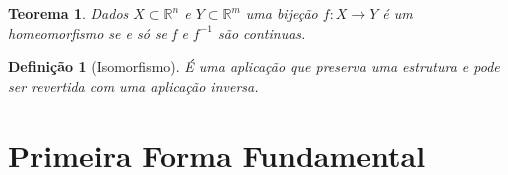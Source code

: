 \documentclass[12pt]{article}
\newtheorem{theorem}{Teorema}
\newtheorem{definition}{Definição}
\begin{document}
\begin{theorem}
Dados $X \subset \mathbb{R}^n$ e $Y \subset \mathbb{R}^m$ uma bijeção $f: X \rightarrow Y$ é um homeomorfismo se e só se f e $f^{-1}$ são continuas.
\end{theorem}

\begin{definition}[Isomorfismo]
É uma aplicação que preserva uma estrutura e pode ser revertida com uma aplicação inversa.
\end{definition}

\section*{Primeira Forma Fundamental}\label{s4}



\end{document}
